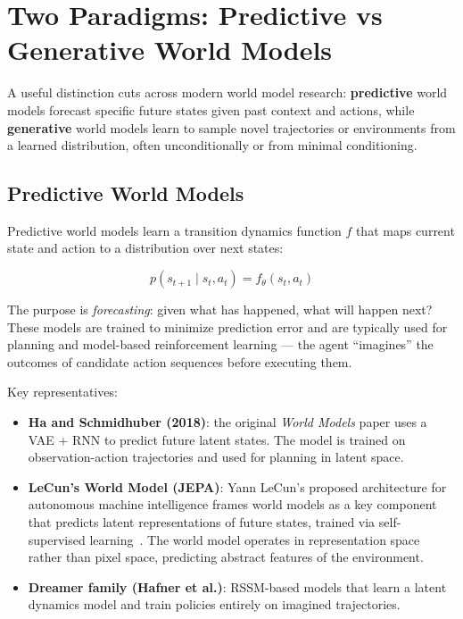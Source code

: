 \documentclass{tufte-handout}
\begin{document}
\section{Two Paradigms: Predictive vs Generative World Models}

A useful distinction cuts across modern world model research: \textbf{predictive} world models
forecast specific future states given past context and actions, while \textbf{generative} world
models learn to sample novel trajectories or environments from a learned distribution, often
unconditionally or from minimal conditioning.

\subsection{Predictive World Models}

Predictive world models learn a transition dynamics function $f$ that maps current state and
action to a distribution over next states:

\begin{equation}
    p(s_{t+1} \mid s_t, a_t) = f_\theta(s_t, a_t)
    \label{eq:predictive}
\end{equation}

The purpose is \textit{forecasting}: given what has happened, what will happen next? These
models are trained to minimize prediction error and are typically used for planning and
model-based reinforcement learning --- the agent ``imagines'' the outcomes of candidate action
sequences before executing them.

Key representatives:
\begin{itemize}
    \item \textbf{Ha and Schmidhuber (2018)}: the original \textit{World Models} paper uses a
          VAE + RNN to predict future latent states. The model is trained on observation-action
          trajectories and used for planning in latent space.
    \item \textbf{LeCun's World Model (JEPA)}: Yann LeCun's proposed architecture for
          autonomous machine intelligence frames world models as a key component that predicts
          latent representations of future states, trained via self-supervised
          learning~\nocite{lecun2022}.
          The world model operates in representation space rather than pixel space, predicting
          abstract features of the environment.
    \item \textbf{Dreamer family (Hafner et al.)}: RSSM-based models that learn a latent dynamics
          model and train policies entirely on imagined trajectories.
\end{itemize}
\end{document}
